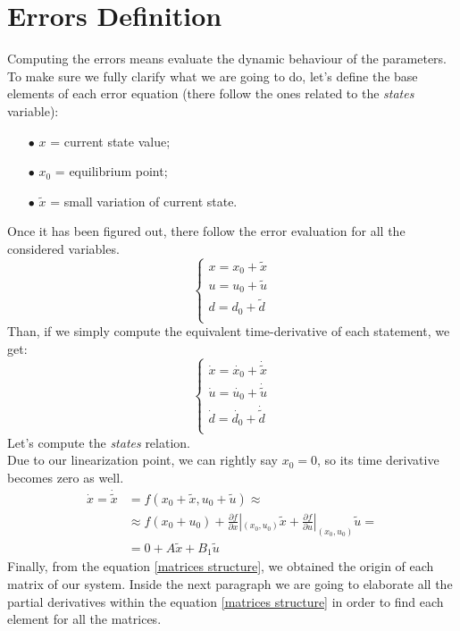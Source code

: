 \section{Errors Definition}
	Computing the errors means evaluate the dynamic behaviour of the parameters. To make sure we fully clarify what we are going to do, let's define the base elements of each error equation (there follow the ones related to the \textit{states} variable):
		\begin{itemize}
			\item[$\bullet$] $x$ = current state value;
			\item[$\bullet$] $x_{0}$ = equilibrium point;
			\item[$\bullet$] $\tilde{x}$ = small variation of current state.
		\end{itemize}
	Once it has been figured out, there follow the error evaluation for all the considered variables.
		\begin{equation*}
			\begin{cases}
				x = x_{0} + \tilde{x} \\
				u = u_{0} + \tilde{u} \\
				d = d_{0} + \tilde{d} \\
			\end{cases}
		\end{equation*}
	Than, if we simply compute the equivalent time-derivative of each statement, we get:
		\begin{equation*}
			\begin{cases}
				\dot{x} = \dot{x_{0}} + \dot{\tilde{x}} \\
				\dot{u} = \dot{u_{0}} + \dot{\tilde{u}} \\
				\dot{d} = \dot{d_{0}} + \dot{\tilde{d}} \\
			\end{cases}
		\end{equation*}
	Let's compute the \textit{states} relation.\\
	Due to our linearization point, we can rightly say $x_{0} = 0 $, so its time derivative becomes zero as well.
		\begin{equation} \label{matrices structure}
			\begin{split}
				\dot{x}  = \dot{\tilde{x}} &= f(x_{0}+\tilde{x},u_{0}+\tilde{u})\approx \\
				&\approx f(x_{0}+u_{0}) + \frac{\partial f}{\partial x} |_{(x_{0},u_{0})} \tilde{x} + \frac{\partial f}{\partial u} |_{(x_{0},u_{0})} \tilde{u} = \\
				&= 0 + A \tilde{x} + B_{1} \tilde{u} 
			\end{split}
		\end{equation}
	Finally, from the equation \ref{matrices structure}, we obtained the origin of each matrix of our system. Inside the next paragraph we are going to elaborate all the partial derivatives within the equation \ref{matrices structure} in order to find each element for all the matrices.

